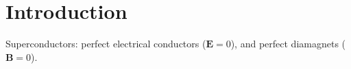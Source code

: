 \chapter{Introduction}\noindent
Superconductors: perfect electrical conductors ($\bm{E} = 0$), and perfect diamagnets ($\bm{B} = 0$).

\lipsum
